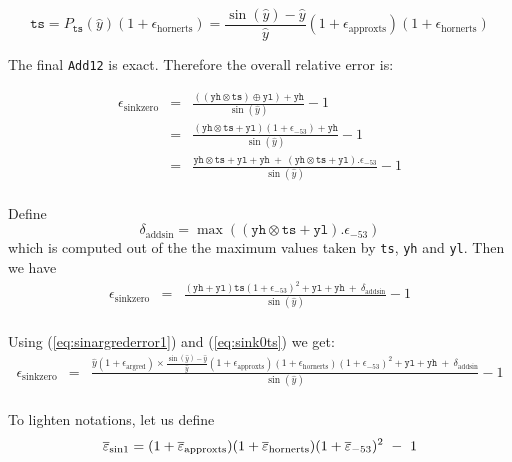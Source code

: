 \begin{equation}
  \mathtt{ts} = P_{\mathtt{ts}}(\hat{y})(1+\epsilon_{\mathrm{hornerts}}) = \frac{\sin(\hat{y})-\hat{y}}{\hat{y}}(1+\epsilon_{\mathrm{approxts}})(1+\epsilon_{\mathrm{hornerts}})
  \label{eq:sink0ts}
\end{equation}

The final \texttt{Add12} is exact. Therefore the overall relative error is:

\begin{eqnarray*}
  \epsilon_{\mathrm{sinkzero}} 
  &=& \frac{((\mathtt{yh}\otimes \mathtt{ts}) \oplus \mathtt{yl}) + \mathtt{yh}}{\sin(\hat{y})} -1 \\
  &=& \frac{(\mathtt{yh}\otimes\mathtt{ts} + \mathtt{yl})(1+\epsilon_{-53}) + \mathtt{yh}}{\sin(\hat{y})} -1\\
  &=& \frac{\mathtt{yh}\otimes\mathtt{ts} + \mathtt{yl} + \mathtt{yh}    \ +\  (\mathtt{yh}\otimes\mathtt{ts} + \mathtt{yl}).\epsilon_{-53}}{\sin(\hat{y})} -1\\
\end{eqnarray*}

Define 
\begin{equation}
  \delta_{\mathrm{addsin}} = \max((\mathtt{yh}\otimes\mathtt{ts} + \mathtt{yl}).\epsilon_{-53})
\label{eq:addsin}
\end{equation}
which is computed out of the  the maximum values taken by \texttt{ts}, \texttt{yh} and \texttt{yl}. Then we have
\begin{eqnarray*}
  \epsilon_{\mathrm{sinkzero}} 
  &=& \frac{(\mathtt{yh} + \mathtt{yl})\mathtt{ts}(1+\epsilon_{-53})^2 + \mathtt{yl} + \mathtt{yh}    \ +\  \delta_{\mathrm{addsin}} }{\sin(\hat{y})} -1\\
\end{eqnarray*}

Using (\ref{eq:sinargrederror1}) and (\ref{eq:sink0ts}) we get:
\begin{eqnarray*}
  \epsilon_{\mathrm{sinkzero}} 
  &=& \frac{\hat{y}(1+\epsilon_{\mathrm{argred}})\times\frac{\sin(\hat{y})-\hat{y}}{\hat{y}}(1+\epsilon_{\mathrm{approxts}})(1+\epsilon_{\mathrm{hornerts}})(1+\epsilon_{-53})^2 + \mathtt{yl} + \mathtt{yh}    \ +\  \delta_{\mathrm{addsin}} }{\sin(\hat{y})} -1\\
\end{eqnarray*}

To lighten notations, let us define 
\begin{equation}
 {\overline{\varepsilon}}_{\mathrm{sin1}} = (1+{\overline{\varepsilon}}_{\mathrm{approxts}})(1+{\overline{\varepsilon}}_{\mathrm{hornerts}})(1+{\overline{\varepsilon}}_{-53})^2 \ -\ 1
  \label{eq:epssin1}
\end{equation}

